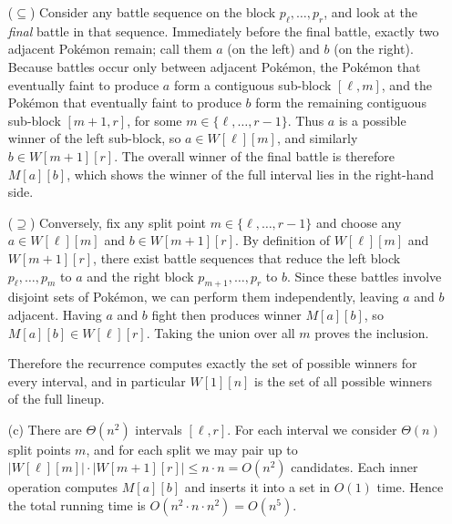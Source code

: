 \documentclass[12pt]{article}
\begin{document}
\begin{enumerate}
\smallskip
($\subseteq$) Consider any battle sequence on the block $p_\ell,\dots,p_r$, and look at the
\emph{final} battle in that sequence. Immediately before the final battle, exactly two
adjacent Pok\'emon remain; call them $a$ (on the left) and $b$ (on the right). Because
battles occur only between adjacent Pok\'emon, the Pok\'emon that eventually faint to
produce $a$ form a contiguous sub-block $[\ell,m]$, and the Pok\'emon that eventually
faint to produce $b$ form the remaining contiguous sub-block $[m+1,r]$, for some
$m \in \{\ell,\dots,r-1\}$. Thus $a$ is a possible winner of the left sub-block, so
$a \in W[\ell][m]$, and similarly $b \in W[m+1][r]$. The overall winner of the final
battle is therefore $M[a][b]$, which shows the winner of the full interval lies in the
right-hand side.

\smallskip
($\supseteq$) Conversely, fix any split point $m \in \{\ell,\dots,r-1\}$ and choose any
$a \in W[\ell][m]$ and $b \in W[m+1][r]$. By definition of $W[\ell][m]$ and $W[m+1][r]$,
there exist battle sequences that reduce the left block $p_\ell,\dots,p_m$ to $a$ and
the right block $p_{m+1},\dots,p_r$ to $b$. Since these battles involve disjoint sets of
Pok\'emon, we can perform them independently, leaving $a$ and $b$ adjacent. Having $a$
and $b$ fight then produces winner $M[a][b]$, so $M[a][b] \in W[\ell][r]$. Taking the
union over all $m$ proves the inclusion.

Therefore the recurrence computes exactly the set of possible winners for every interval,
and in particular $W[1][n]$ is the set of all possible winners of the full lineup.

\item[(c)] There are $\Theta(n^2)$ intervals $[\ell,r]$. For each interval we consider
$\Theta(n)$ split points $m$, and for each split we may pair up to
$|W[\ell][m]| \cdot |W[m+1][r]| \le n \cdot n = O(n^2)$ candidates. Each inner operation
computes $M[a][b]$ and inserts it into a set in $O(1)$ time. Hence the total running time
is $O(n^2 \cdot n \cdot n^2) = O(n^5)$.

\end{enumerate}
\end{document}
